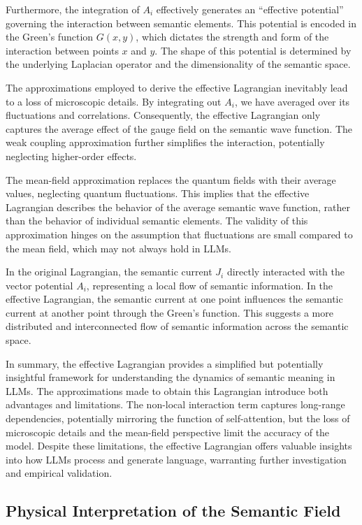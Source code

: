 \documentclass[prd,amsmath,amssymb,12pt]{revtex4}
\begin{document}
Furthermore, the integration of $A_i$ effectively generates an ``effective potential''
governing the interaction between semantic elements. This potential is encoded in the
Green's function $G(x,y)$, which dictates the strength and form of the interaction
between points $x$ and $y$. The shape of this potential is determined by the
underlying Laplacian operator and the dimensionality of the semantic space.

The approximations employed to derive the effective Lagrangian inevitably lead
to a loss of microscopic details. By integrating out $A_i$, we have averaged over
its fluctuations and correlations. Consequently, the effective Lagrangian only
captures the average effect of the gauge field on the semantic wave function.
The weak coupling approximation further simplifies the interaction, potentially
neglecting higher-order effects.

The mean-field approximation replaces the quantum fields with their average values,
neglecting quantum fluctuations. This implies that the effective Lagrangian describes
the behavior of the average semantic wave function, rather than the behavior of
individual semantic elements. The validity of this approximation hinges on the
assumption that fluctuations are small compared to the mean field, which may not
always hold in LLMs.

In the original Lagrangian, the semantic current $J_i$ directly interacted with
the vector potential $A_i$, representing a local flow of semantic information.
In the effective Lagrangian, the semantic current at one point influences the
semantic current at another point through the Green's function. This suggests
a more distributed and interconnected flow of semantic information across
the semantic space.

In summary, the effective Lagrangian provides a simplified but potentially
insightful framework for understanding the dynamics of semantic meaning in LLMs.
The approximations made to obtain this Lagrangian introduce both advantages and
limitations. The non-local interaction term captures long-range dependencies,
potentially mirroring the function of self-attention, but the loss of microscopic
details and the mean-field perspective limit the accuracy of the model.
Despite these limitations, the effective Lagrangian offers valuable insights
into how LLMs process and generate language, warranting further investigation
and empirical validation.

\subsection{Physical Interpretation of the Semantic Field}
\end{document}
